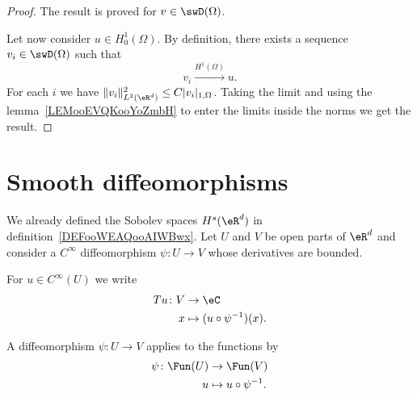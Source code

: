 \begin{proof}
	The result is proved for \( v\in\swD(\Omega)\).

	Let now consider \( u\in H_0^1(\Omega)\). By definition, there exists a sequence \( v_i\in\swD(\Omega)\) such that
	\begin{equation}
		v_i\stackrel{H^1(\Omega)}{\longrightarrow}u.
	\end{equation}
	For each \( i\) we have \( \| v_i \|^2_{L^2(\eR^d)}\leq C| v_i |_{1,\Omega}\). Taking the limit and using the lemma~\ref{LEMooEVQKooYoZmbH} to enter the limits inside the norms we get the result.
\end{proof}

\section{Smooth diffeomorphisms}

We already defined the Sobolev spaces \( H^s(\eR^d)\) in definition~\ref{DEFooWEAQooAIWBwx}. Let \( U\) and \( V\) be open parts of \( \eR^d\) and consider a \(  C^{\infty}\) diffeomorphism \( \psi\colon U\to V\) whose derivatives are bounded.

For \( u\in  C^{\infty}(U)\) we write
\begin{equation}        \label{EQooHSVBooIZRxzh}
	\begin{aligned}
		Tu\colon V & \to \eC                        \\
		x          & \mapsto (u\circ \psi^{-1})(x).
	\end{aligned}
\end{equation}

A diffeomorphism \( \psi\colon U\to V\) applies to the functions by
\begin{equation}        \label{EQooMZSEooATfSTR}
	\begin{aligned}
		\psi\colon \Fun(U) & \to \Fun(V)              \\
		u                  & \mapsto u\circ\psi^{-1}.
	\end{aligned}
\end{equation}


